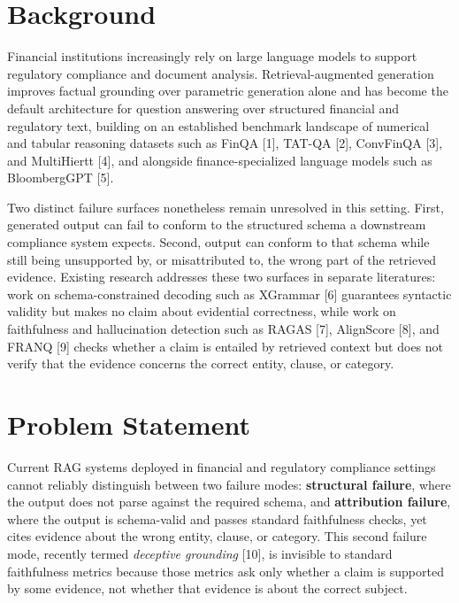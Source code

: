 \documentclass[11pt,a4paper]{article}
\begin{document}
\section{Background}

Financial institutions increasingly rely on large language models to support regulatory
compliance and document analysis. Retrieval-augmented generation improves factual
grounding over parametric generation alone and has become the default architecture for
question answering over structured financial and regulatory text, building on an
established benchmark landscape of numerical and tabular reasoning datasets such as
FinQA [1], TAT-QA [2], ConvFinQA [3], and MultiHiertt [4], and alongside
finance-specialized language models such as BloombergGPT [5].

Two distinct failure surfaces nonetheless remain unresolved in this setting. First,
generated output can fail to conform to the structured schema a downstream compliance
system expects. Second, output can conform to that schema while still being unsupported
by, or misattributed to, the wrong part of the retrieved evidence. Existing research
addresses these two surfaces in separate literatures: work on schema-constrained
decoding such as XGrammar [6] guarantees syntactic validity but makes no claim about
evidential correctness, while work on faithfulness and hallucination detection such as
RAGAS [7], AlignScore [8], and FRANQ [9] checks whether a claim is entailed by retrieved
context but does not verify that the evidence concerns the correct entity, clause, or
category.

\section{Problem Statement}

Current RAG systems deployed in financial and regulatory compliance settings cannot
reliably distinguish between two failure modes: \textbf{structural failure}, where the
output does not parse against the required schema, and \textbf{attribution failure},
where the output is schema-valid and passes standard faithfulness checks, yet cites
evidence about the wrong entity, clause, or category. This second failure mode, recently
termed \textit{deceptive grounding} [10], is invisible to standard faithfulness metrics
because those metrics ask only whether a claim is supported by some evidence, not
whether that evidence is about the correct subject.
\end{document}
